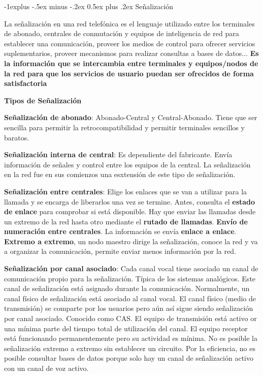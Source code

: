 \documentclass[10pt,portrait, twocolumn]{article}
\makeatletter
\renewcommand{\subsection}{\@startsection{subsection}{2}{0mm}%
                                {-1explus -.5ex minus -.2ex}%
                                {0.5ex plus .2ex}%
                                {\normalfont\normalsize\bfseries}}
\makeatother
\begin{document}
\hrulefill

\subsection{Señalización}

La señalización en una red telefónica es el lenguaje utilizado entre los terminales de abonado, centrales de conmutación y equipos de inteligencia de red para establecer una comunicación, proveer los medios de control para ofrecer servicios suplementarios, proveer mecanismos para realizar consultas a bases de datos... \textbf{Es la información que se intercambia entre terminales y equipos/nodos de la red para que los servicios de usuario puedan ser ofrecidos de forma satisfactoria}

\textbf{Tipos de Señalización}

\textbf{Señalización de abonado}: Abonado-Central y Central-Abonado. Tiene que ser sencilla para permitir la retrocompatibilidad y permitir terminales sencillos y baratos.

\textbf{Señalización interna de central}: Es dependiente del fabricante. Envía información de señales y control entre los equipos de la central. La señalización en la red fue en sus comienzos una esxtensión de este tipo de señalización.

\textbf{Señalización entre centrales}: Elige los enlaces que se van a utilizar para la llamada y se encarga de liberarlos una vez se termine. Antes, consulta el \textbf{estado de enlace} para comprobar si está disponible. Hay que enviar las llamadas desde un extremo de la red hasta otro mediante el \textbf{rutado de llamadas}. \textbf{Envío de numeración entre centrales}. La información se envía \textbf{enlace a enlace}. \textbf{Extremo a extremo}, un nodo maestro dirige la señalización, conoce la red y va a organizar la comunicación, permite enviar menos información por la red.

\textbf{Señalización por canal asociado}: Cada canal vocal tiene asociado un canal de comunicación propio para la señalización. Típica de los sistemas analógicos. Este canal de señalización está asignado durante la comunicación. Normalmente, un canal físico de señalización está asociado al canal vocal. El canal físico (medio de transmisión) se comparte por los usuarios pero aún así sigue siendo señalización por canal asociado. Conocido como CAS. El equipo de transmisión está activo or una mínima parte del tiempo total de utilización del canal. El equipo receptor está funcionando permanentemente pero su actividad es mínima. No es posible la señalización extremo a extremo sin establecer un circuito. Por la eficiencia, no es posible consultar bases de datos porque solo hay un canal de señalización activo con un canal de voz activo.
	
\end{document}

